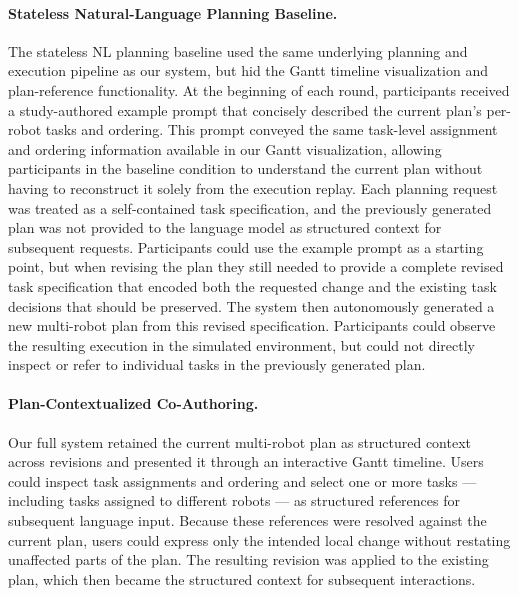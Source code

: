 \paragraph{Stateless Natural-Language Planning Baseline.}

The stateless NL planning baseline used the same underlying planning and execution pipeline as our system, but hid the Gantt timeline visualization and plan-reference functionality.
At the beginning of each round, participants received a study-authored example prompt that concisely described the current plan's per-robot tasks and ordering.
This prompt conveyed the same task-level assignment and ordering information available in our Gantt visualization, allowing participants in the baseline condition to understand the current plan without having to reconstruct it solely from the execution replay.
Each planning request was treated as a self-contained task specification, and the previously generated plan was not provided to the language model as structured context for subsequent requests.
Participants could use the example prompt as a starting point, but when revising the plan they still needed to provide a complete revised task specification that encoded both the requested change and the existing task decisions that should be preserved.
The system then autonomously generated a new multi-robot plan from this revised specification.
Participants could observe the resulting execution in the simulated environment, but could not directly inspect or refer to individual tasks in the previously generated plan.

\paragraph{Plan-Contextualized Co-Authoring.}

Our full system retained the current multi-robot plan as structured context across revisions and presented it through an interactive Gantt timeline.
Users could inspect task assignments and ordering and select one or more tasks --- including tasks assigned to different robots --- as structured references for subsequent language input.
Because these references were resolved against the current plan, users could express only the intended local change without restating unaffected parts of the plan.
The resulting revision was applied to the existing plan, which then became the structured context for subsequent interactions.


